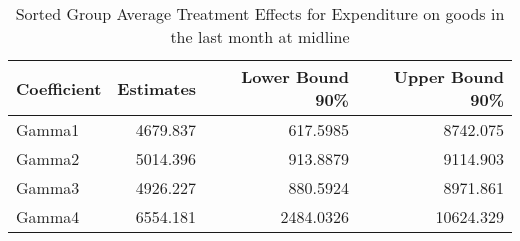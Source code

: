 \begin{table}

\caption{\label{tab:gatesRExpenditure_totDF}Sorted Group Average Treatment Effects for Expenditure on goods in the last month at midline}
\centering
\begin{tabular}[t]{lrrr}
\toprule
Coefficient & Estimates & Lower Bound 90\% & Upper Bound 90\%\\
\midrule
Gamma1 & 4679.837 & 617.5985 & 8742.075\\
Gamma2 & 5014.396 & 913.8879 & 9114.903\\
Gamma3 & 4926.227 & 880.5924 & 8971.861\\
Gamma4 & 6554.181 & 2484.0326 & 10624.329\\
\bottomrule
\end{tabular}
\end{table}
